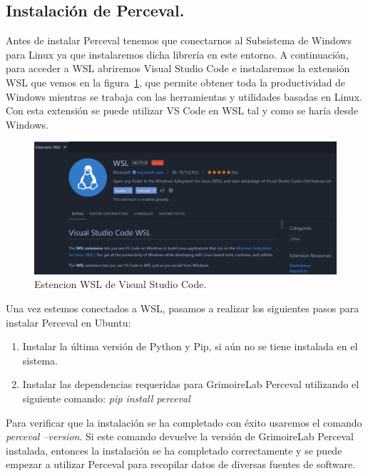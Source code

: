 \documentclass[a4paper, 12pt]{book}
\begin{document}
\subsection{Instalación de Perceval.} %
\label{sec:instalación de perceval}

Antes de instalar Perceval tenemos que conectarnos al Subsistema de Windows para Linux ya que instalaremos dicha librería en este entorno.
A continuación, para acceder a WSL abriremos Visual Studio Code e instalaremos la extensión WSL que vemos en la figura~\ref{fig:extensionwsl}, que permite obtener toda la productividad de Windows mientras se trabaja con las herramientas y utilidades basadas en Linux.
Con esta extensión se puede utilizar VS Code en WSL tal y como se haría desde Windows.

\begin{figure}
  \centering
  \includegraphics[width=14cm, keepaspectratio]{img/extension_wsl.PNG}
  \caption{Estencion WSL de Visual Studio Code.}\label{fig:extensionwsl}
\end{figure}

Una vez estemos conectados a WSL, pasamos a realizar los siguientes pasos para instalar Perceval en Ubuntu:
\begin{enumerate}
  \item Instalar la última versión de Python y Pip, si aún no se tiene instalada en el sistema.
  \item Instalar las dependencias requeridas para GrimoireLab Perceval utilizando el siguiente comando: \emph{pip install perceval}
\end{enumerate}

Para verificar que la instalación se ha completado con éxito usaremos el comando \emph{perceval --version}. 
Si este comando devuelve la versión de GrimoireLab Perceval instalada, entonces la instalación se ha completado correctamente y se puede empezar a utilizar Perceval para recopilar datos de diversas fuentes de software.
\end{document}
